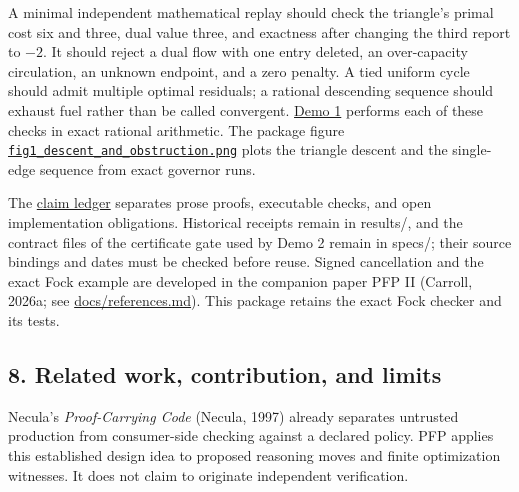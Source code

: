 \documentclass[
  11pt,
]{article}
\begin{document}
A minimal independent mathematical replay should check the triangle's
primal cost six and three, dual value three, and exactness after
changing the third report to \(-2\). It should reject a dual flow with
one entry deleted, an over-capacity circulation, an unknown endpoint,
and a zero penalty. A tied uniform cycle should admit multiple optimal
residuals; a rational descending sequence should exhaust fuel rather
than be called convergent.
\href{https://github.com/dbccpage/the_symbol_game/blob/main/omega_engine_education/documentation/030_pfp_proposal_fidelity_protocol_pfp/papers/omega_engine_symbol_game/001_pfp_discrete_cochain_retraction_and_toy_involutions/code/demo1_holonomy.py}{Demo
1} performs each of these checks in exact rational arithmetic. The
package figure
\href{https://github.com/dbccpage/the_symbol_game/blob/main/omega_engine_education/documentation/030_pfp_proposal_fidelity_protocol_pfp/papers/omega_engine_symbol_game/001_pfp_discrete_cochain_retraction_and_toy_involutions/public_export/fig1_descent_and_obstruction.png}{\nolinkurl{fig1_descent_and_obstruction.png}}
plots the triangle descent and the single-edge sequence from exact
governor runs.

The
\href{https://github.com/dbccpage/the_symbol_game/blob/main/omega_engine_education/documentation/030_pfp_proposal_fidelity_protocol_pfp/papers/omega_engine_symbol_game/001_pfp_discrete_cochain_retraction_and_toy_involutions/paper_claim_ledger.md}{claim
ledger} separates prose proofs, executable checks, and open
implementation obligations. Historical receipts remain in results/, and
the contract files of the certificate gate used by Demo 2 remain in
specs/; their source bindings and dates must be checked before reuse.
Signed cancellation and the exact Fock example are developed in the
companion paper PFP II (Carroll, 2026a; see
\href{https://github.com/dbccpage/the_symbol_game/blob/main/omega_engine_education/documentation/030_pfp_proposal_fidelity_protocol_pfp/papers/omega_engine_symbol_game/001_pfp_discrete_cochain_retraction_and_toy_involutions/docs/references.md}{docs/references.md}).
This package retains the exact Fock checker and its tests.

\subsection{8. Related work, contribution, and
limits}\label{related-work-contribution-and-limits}

Necula's \emph{Proof-Carrying Code} (Necula, 1997) already separates
untrusted production from consumer-side checking against a declared
policy. PFP applies this established design idea to proposed reasoning
moves and finite optimization witnesses. It does not claim to originate
independent verification.
\end{document}
